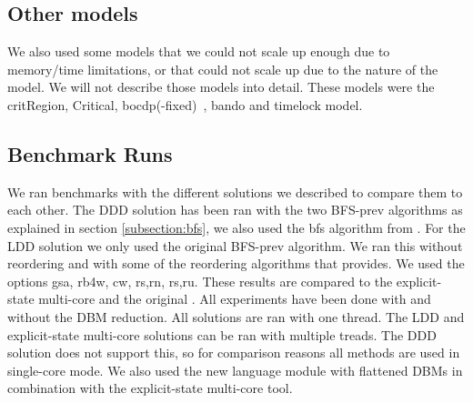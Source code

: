 \subsection{Other models}
We also used some models that we could not scale up enough due to memory/time limitations, or that could not scale up due to the nature of the model. We will not describe those models into detail. These models were the critRegion, Critical, bocdp(-fixed)~\cite{641264}, bando and timelock model.

\subsection{Benchmark Runs}
We ran benchmarks with the different solutions we described to compare them to each other. The DDD solution has been ran with the two BFS-prev algorithms as explained in section \ref{subsection:bfs}, we also used the bfs algorithm from \ltsmin{}. For the LDD solution we only used the original BFS-prev algorithm. We ran this without reordering and with some of the reordering algorithms that \ltsmin{} provides. We used the options gsa, rb4w, cw, rs,rn, rs,ru. These results are compared to the explicit-state multi-core \ltsmin{} and the original \uppaal{}. All experiments have been done with and without the DBM reduction. All solutions are ran with one thread. The LDD and explicit-state multi-core solutions can be ran with multiple treads. The DDD solution does not support this, so for comparison reasons all methods are used in single-core mode. We also used the new language module with flattened DBMs in combination with the explicit-state multi-core tool.
